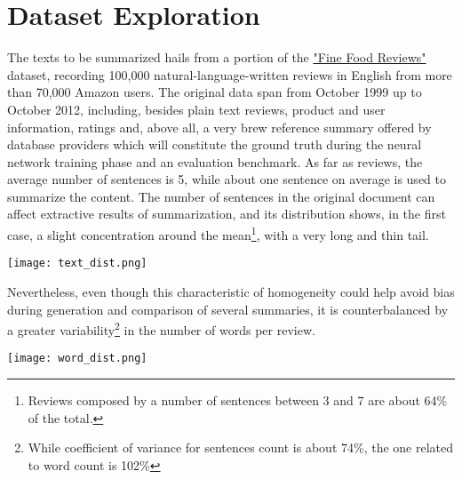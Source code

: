 \documentclass[fleqn,10pt]{SelfArx} %
\affiliation{\textsuperscript{*}\textit{Universita` degli Studi di Milano Bicocca, CdLM in Data Science}}
\begin{document}
\flushbottom %

\maketitle %

\tableofcontents %

\thispagestyle{empty} %


\section{Dataset Exploration} 
The texts to be summarized hails from a portion of the \href{https://www.kaggle.com/snap/amazon-fine-food-reviews}{"Fine Food Reviews"} dataset, recording 100,000 natural-language-written reviews in English from more than 70,000 Amazon users. The original data span from October 1999 up to October 2012, including, besides plain text reviews, product and user information, ratings and, above all, a very brew reference summary offered by database providers which will constitute the ground truth during the neural network training phase and an evaluation benchmark. As far as reviews, the average number of sentences is 5, while about one sentence on average is used to summarize the content. The number of sentences in the original document can affect extractive results of summarization, and its distribution shows, in the first case, a slight concentration around the mean\footnote{Reviews composed by a number of sentences between 3 and 7 are about 64\% of the total.}, with a very long and thin tail.\par
{\centering\vspace{10pt}
\texttt{[image: text\_dist.png]}
\vspace{10pt}
\par}
Nevertheless, even though this characteristic of homogeneity could help avoid bias during generation and comparison of several summaries, it is counterbalanced by a greater variability\footnote{While coefficient of variance for sentences count is about 74\%, the one related to word count is 102\%} in the number of words per review.
\par
{\centering\vspace{10pt}
\texttt{[image: word\_dist.png]}
\vspace{10pt}
\par}
\end{document}
